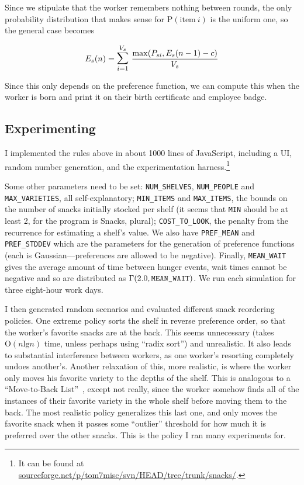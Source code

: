 \documentclass[twocolumn]{article}
\begin{document}
Since we stipulate that the worker remembers nothing between rounds, the only probability distribution that makes sense for $\mathrm{P}(\mathrm{item}\ i)$ is the uniform one, so the general case becomes

$$
E_s(n) = \mathlarger{\mathlarger{\sum}}_{i=1}^{V_s}\ \frac{\mathrm{max}(P_{si}, E_s(n - 1) - c)}{V_s}
$$

Since this only depends on the preference function, we can compute this when the worker is born and print it on their birth certificate and employee badge.

\subsection{Experimenting}

I implemented the rules above in about 1000 lines of JavaScript,
including a UI, random number generation, and the experimentation harness.\footnote{It can be found at \url{sourceforge.net/p/tom7misc/svn/HEAD/tree/trunk/snacks/}.} 

Some other parameters need to be set: \verb+NUM_SHELVES+, \verb+NUM_PEOPLE+ and \verb+MAX_VARIETIES+, all self-explanatory; \verb+MIN_ITEMS+ and \verb+MAX_ITEMS+, the bounds on the number of snacks initially stocked per shelf (it seems that \verb+MIN+ should be at least 2, for the program is Snacks, plural); \verb+COST_TO_LOOK+, the penalty from the recurrence for estimating a shelf's value. We also have \verb+PREF_MEAN+ and \verb+PREF_STDDEV+ which are the parameters for the generation of preference functions (each is Gaussian---preferences are allowed to be negative). Finally, \verb+MEAN_WAIT+ gives the average amount of time between hunger events, wait times cannot be negative and so are distributed as $\Gamma(2.0, \verb+MEAN_WAIT+)$. We run each simulation for three eight-hour work days.

I then generated random scenarios and evaluated different snack
reordering policies. One extreme policy sorts the shelf in reverse
preference order, so that the worker's favorite snacks are at the
back. This seems unnecessary (takes $\mathrm{O}(n \mathrm{lg} n)$
time, unless perhaps using ``radix sort'') and unrealistic. It also
leads to substantial interference between workers, as one worker's
resorting completely undoes another's. Another relaxation of this,
more realistic, is where the worker only moves his favorite variety to
the depths of the shelf. This is analogous to a ``Move-to-Back
List''~\cite{rivest1976self}, except not really, since the worker
somehow finds all of the instances of their favorite variety in the
whole shelf before moving them to the back. The most realistic policy
generalizes this last one, and only moves the favorite snack when it
passes some ``outlier'' threshold for how much it is preferred over
the other snacks. This is the policy I ran many experiments for.
\end{document}
